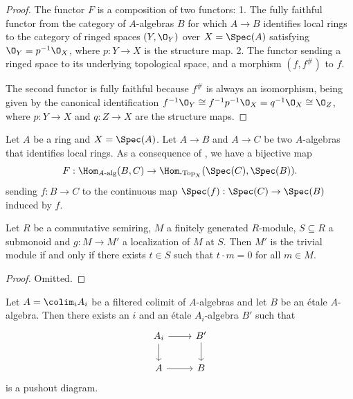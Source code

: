 \begin{proof}
The functor \(F\) is a composition of two functors:
1. The fully faithful functor from the category of \(A\)-algebras \(B\) for which \(A \to B\) identifies local rings to the category of ringed spaces \((Y, \O_Y)\) over \(X = \Spec(A)\) satisfying \(\O_Y = p^{-1}\O_X\), where \(p: Y \to X\) is the structure map.
2. The functor sending a ringed space to its underlying topological space, and a morphism \((f, f^\#)\) to \(f\).

The second functor is fully faithful because \(f^\#\) is always an isomorphism, being given by the canonical identification \(f^{-1}\O_Y \cong f^{-1}p^{-1}\O_X = q^{-1}\O_X \cong \O_Z\), where \(p: Y \to X\) and \(q: Z \to X\) are the structure maps.
\end{proof}

\begin{definition}
  \label{def:identifies-local-ring-hom-set-bijection}
  Let \(A\) be a ring and \(X = \Spec(A)\). Let \(A \to B\) and \(A \to C\) be two \(A\)-algebras that identifies local rings. As a consequence of , we have a bijective map 
  \[F : \Hom_{A\textnormal{-alg}}(B, C) \to \Hom_{\textnormal{-Top}_X}(\Spec(C), \Spec(B)).\]
  sending \(f : B \to C\) to the continuous map \(\Spec(f) : \Spec(C) \to \Spec(B)\) induced by \(f\).
\end{definition}

\begin{lemma}
    Let $R$ be a commutative semiring, $M$ a finitely generated $R$-module, $S \subseteq R$ a submonoid
    and $g \colon M \to M'$ a localization of $M$ at $S$. Then $M'$ is the trivial module if and only if
    there exists $t \in S$ such that $t \cdot m = 0$ for all $m \in M$.
    \label{lemma:fg-localization-subsingleton-uniform-annihilator}
    \leanok
\end{lemma}

\begin{proof}
    \leanok
    Omitted.
\end{proof}

\begin{lemma}
    Let $A = \colim_i A_i$ be a filtered colimit of $A$-algebras and let $B$ be an étale $A$-algebra. Then
    there exists an $i$ and an étale $A_i$-algebra $B'$ such that
    \[
    \begin{tikzcd}
        A_i \arrow{r} \arrow{d} & B' \arrow{d} \\
        A \arrow{r} & B
    \end{tikzcd}
    \] is a pushout diagram.
    \label{lemma:etale-ind-spreads}
\end{lemma}

